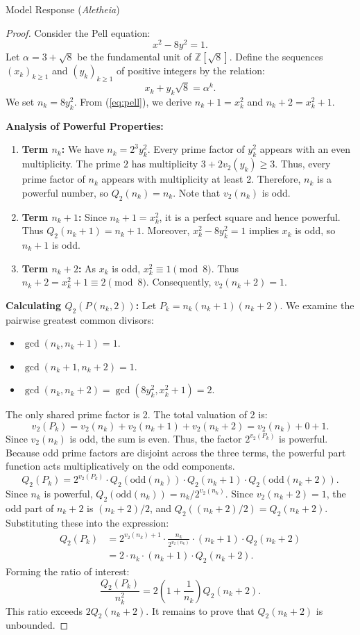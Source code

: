 \documentclass[11pt]{article}
\newcommand{\Qtwo}{Q_2}
\newcommand{\Z}{\mathbb{Z}}
\begin{document}
\begin{solution}{Model Response (\emph{Aletheia})}
\begin{proof}
Consider the Pell equation:
\begin{equation} \label{eq:pell}
x^2 - 8y^2 = 1.
\end{equation}
Let $\alpha = 3 + \sqrt{8}$ be the fundamental unit of $\Z[\sqrt{8}]$. Define the sequences $(x_k)_{k \ge 1}$ and $(y_k)_{k \ge 1}$ of positive integers by the relation:
\[ x_k + y_k\sqrt{8} = \alpha^k. \]
We set $n_k = 8y_k^2$. From (\ref{eq:pell}), we derive $n_k+1 = x_k^2$ and $n_k+2 = x_k^2+1$.

\textbf{Analysis of Powerful Properties:}
\begin{enumerate}
\item \textbf{Term $n_k$:} We have $n_k = 2^3 y_k^2$. Every prime factor of $y_k^2$ appears with an even multiplicity. The prime $2$ has multiplicity $3 + 2v_2(y_k) \ge 3$. Thus, every prime factor of $n_k$ appears with multiplicity at least 2. Therefore, $n_k$ is a powerful number, so $\Qtwo(n_k) = n_k$. Note that $v_2(n_k)$ is odd.
\item \textbf{Term $n_k+1$:} Since $n_k+1 = x_k^2$, it is a perfect square and hence powerful. Thus $\Qtwo(n_k+1) = n_k+1$. Moreover, $x_k^2 - 8y_k^2 = 1$ implies $x_k$ is odd, so $n_k+1$ is odd.
\item \textbf{Term $n_k+2$:} As $x_k$ is odd, $x_k^2 \equiv 1 \pmod 8$. Thus $n_k+2 = x_k^2+1 \equiv 2 \pmod 8$. Consequently, $v_2(n_k+2) = 1$.
\end{enumerate}

\textbf{Calculating $\Qtwo(P(n_k, 2))$:}
Let $P_k = n_k(n_k+1)(n_k+2)$.
We examine the pairwise greatest common divisors:
\begin{itemize}
\item $\gcd(n_k, n_k+1) = 1$.
\item $\gcd(n_k+1, n_k+2) = 1$.
\item $\gcd(n_k, n_k+2) = \gcd(8y_k^2, x_k^2+1) = 2$.
\end{itemize}
The only shared prime factor is 2. The total valuation of 2 is:
\[ v_2(P_k) = v_2(n_k) + v_2(n_k+1) + v_2(n_k+2) = v_2(n_k) + 0 + 1. \]
Since $v_2(n_k)$ is odd, the sum is even. Thus, the factor $2^{v_2(P_k)}$ is powerful.
Because odd prime factors are disjoint across the three terms, the powerful part function acts multiplicatively on the odd components.
\[ \Qtwo(P_k) = 2^{v_2(P_k)} \cdot \Qtwo(\text{odd}(n_k)) \cdot \Qtwo(n_k+1) \cdot \Qtwo(\text{odd}(n_k+2)). \]
Since $n_k$ is powerful, $\Qtwo(\text{odd}(n_k)) = n_k / 2^{v_2(n_k)}$.
Since $v_2(n_k+2)=1$, the odd part of $n_k+2$ is $(n_k+2)/2$, and $\Qtwo((n_k+2)/2) = \Qtwo(n_k+2)$.
Substituting these into the expression:
\begin{align*}
\Qtwo(P_k) &= 2^{v_2(n_k)+1} \cdot \frac{n_k}{2^{v_2(n_k)}} \cdot (n_k+1) \cdot \Qtwo(n_k+2) \\
&= 2 \cdot n_k \cdot (n_k+1) \cdot \Qtwo(n_k+2).
\end{align*}
Forming the ratio of interest:
\[ \frac{\Qtwo(P_k)}{n_k^2} = 2 \left( 1 + \frac{1}{n_k} \right) \Qtwo(n_k+2). \]
This ratio exceeds $2 \Qtwo(n_k+2)$. It remains to prove that $\Qtwo(n_k+2)$ is unbounded.


\end{proof}
\end{solution}
\end{document}
